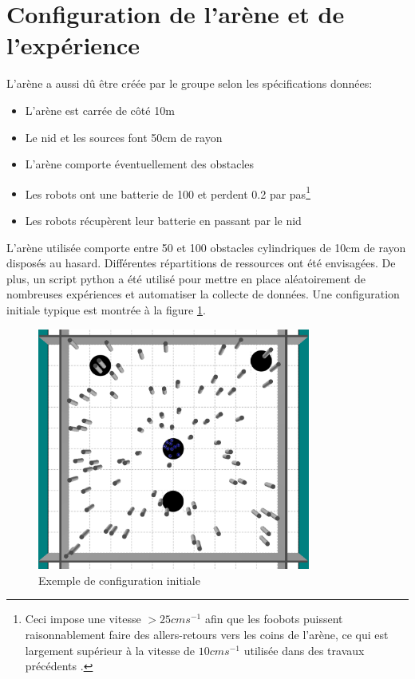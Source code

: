 \section{Configuration de l'arène et de l'expérience}

L'arène a aussi dû être créée par le groupe selon les spécifications données:
\begin{itemize}
  \item L'arène est carrée de côté 10m
  \item Le nid et les sources font 50cm de rayon
  \item L'arène comporte éventuellement des obstacles
  \item Les robots ont une batterie de 100 et perdent 0.2 par pas\footnote{Ceci impose une vitesse $>25cms^{-1}$ afin que les foobots puissent raisonnablement faire des allers-retours vers les coins de l'arène, ce qui est largement supérieur à la vitesse de $10cms^{-1}$ utilisée dans des travaux précédents \cite{foraging, pheromonesForaging}.}
  \item Les robots récupèrent leur batterie en passant par le nid
\end{itemize}

L'arène utilisée comporte entre 50 et 100 obstacles cylindriques de 10cm de rayon disposés au hasard. Différentes répartitions de ressources ont été envisagées. De plus, un script python a été utilisé pour mettre en place aléatoirement de nombreuses expériences et automatiser la collecte de données. Une configuration initiale typique est montrée à la figure \ref{fig:initArena}.
\begin{figure}[htb]
  \centering
  \includegraphics[width=0.8\textwidth]{pics/initArena.png}
  \caption{Exemple de configuration initiale\label{fig:initArena}}
\end{figure}


